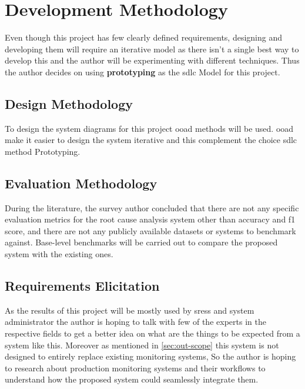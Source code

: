 \section{Development Methodology}

Even though this project has few clearly defined requirements, designing and developing them will require an iterative model as there isn't a single best way to develop this and the author will be experimenting with different techniques. Thus the author decides on using \textbf{prototyping} as the \ac{sdlc} Model for this project.\\

\subsection{Design Methodology}

To design the system diagrams for this project \ac{ooad} methods will be used. \ac{ooad} make it easier to design the system iterative and this complement the choice \ac{sdlc} method Prototyping.

\subsection{Evaluation Methodology}

During the literature, the survey author concluded that there are not any specific evaluation metrics for the root cause analysis system other than accuracy and f1 score, and there are not any publicly available datasets or systems to benchmark against. Base-level benchmarks will be carried out to compare the proposed system with the existing ones. 

\subsection{Requirements Elicitation}

As the results of this project will be mostly used by \acp{sres} and system administrator the author is hoping to talk with few of the experts in the respective fields to get a better idea on what are the things to be expected from a system like this. Moreover as mentioned in \ref{sec:out-scope} this system is not designed to entirely replace existing monitoring systems, So the author is hoping to research about production monitoring systems and their workflows to understand how the proposed system could seamlessly integrate them. 
